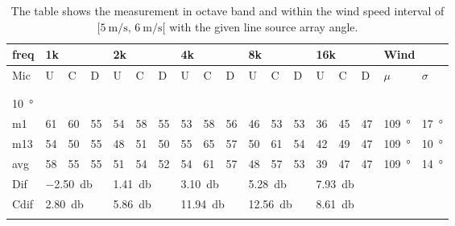 \begin{table}[H]
\centering
\caption{The table shows the measurement in octave band and within the wind speed interval of $[\SI{5}{\meter\per\second},\, \SI{6}{\meter\per\second}[ $ with the given line source array angle.}
\setlength\tabcolsep{5pt} %
\begin{tabular}{l|l|l|l|l|l|l|l|l|l|l|l|l|l|l|l|l|l}
freq & \multicolumn{3}{l|}{1k} & \multicolumn{3}{l|}{2k} & \multicolumn{3}{l|}{4k} & \multicolumn{3}{l|}{8k} & \multicolumn{3}{l|}{16k}   &  \multicolumn{2}{l}{Wind}                      \\ \hline
Mic  & U      & C      & D     & U      & C      & D     & U      & C      & D     & U      & C      & D     & U  & C  & D & $\mu$ & $\sigma$ \\ \hline
 & \multicolumn{3}{l|}{} & \multicolumn{3}{l|}{} & \multicolumn{3}{l|}{} & \multicolumn{3}{l|}{} & \multicolumn{3}{l|}{} &      \multicolumn{2}{l}{}                        \\ 
 \multicolumn{18}{l}{ } \\                             
\SI{10}{\degree}   & \multicolumn{3}{l|}{} & \multicolumn{3}{l|}{} & \multicolumn{3}{l|}{} & \multicolumn{3}{l|}{} & \multicolumn{3}{l|}{}  &  \multicolumn{2}{l}{}  \\  \hline
m1   & 61     &  60    & 55    &  54    &   58   &  55   &  53    &  58    &   56  &  46    &  53    &  53   & 36 & 45 &  47 &  \SI{109}{\degree} & \SI{17}{\degree}  \\ 
m13   &  54    &  50    & 55    & 48     &  51    &  50   &  55    &  65    & 57    & 50     &  61    &  54   & 42 & 49 &  47 & \SI{109}{\degree} & \SI{10}{\degree}   \\ \hline
avg & 58     & 55     & 55   &  51    & 54     &  52   &   54   & 61     &  57   &  48    &  57    & 53    & 39 &47 & 47 & \SI{109}{\degree} & \SI{14}{\degree}   \\ \hline 
Dif & \multicolumn{3}{l|}{\SI{-2.50}{\decibel}} & \multicolumn{3}{l|}{\SI{1.41}{\decibel}} & \multicolumn{3}{l|}{\SI{3.10}{\decibel}} & \multicolumn{3}{l|}{\SI{5.28}{\decibel}} & \multicolumn{3}{l|}{\SI{7.93}{\decibel}}  &   \multicolumn{2}{l}{}   \\ \hline 
Cdif & \multicolumn{3}{l|}{\SI{2.80}{\decibel}} & \multicolumn{3}{l|}{\SI{5.86}{\decibel}} & \multicolumn{3}{l|}{\SI{11.94}{\decibel}} & \multicolumn{3}{l|}{\SI{12.56}{\decibel}} & \multicolumn{3}{l|}{\SI{8.61}{\decibel}}  &   \multicolumn{2}{l}{}   \\ 
 \multicolumn{18}{l}{ } \\                             

\end{tabular}
\end{table}

